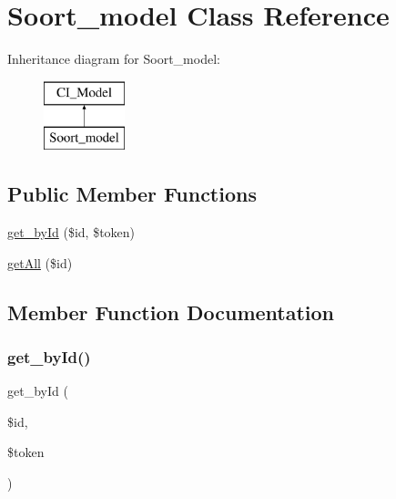 \hypertarget{class_soort__model}{}\section{Soort\+\_\+model Class Reference}
\label{class_soort__model}
Inheritance diagram for Soort\+\_\+model\+:\begin{figure}[H]
\begin{center}
\leavevmode
\includegraphics[height=2.000000cm]{class_soort__model}
\end{center}
\end{figure}
\subsection*{Public Member Functions}
\begin{DoxyCompactItemize}
\item 
\mbox{\hyperlink{class_soort__model_a56ce0c577bb5f34bcc355107c47f06e8}{get\+\_\+by\+Id}} (\$id, \$token)
\item 
\mbox{\hyperlink{class_soort__model_a9169319ec748964dc67f0f640d182250}{get\+All}} (\$id)
\end{DoxyCompactItemize}


\subsection{Member Function Documentation}
\mbox{\label{class_soort__model_a56ce0c577bb5f34bcc355107c47f06e8}} 
\subsubsection{\texorpdfstring{get\+\_\+by\+Id()}{get\_byId()}}
{\footnotesize\ttfamily get\+\_\+by\+Id (\begin{DoxyParamCaption}\item[{}]{\$id,  }\item[{}]{\$token }\end{DoxyParamCaption})}

\mbox{\label{class_soort__model_a9169319ec748964dc67f0f640d182250}} 
